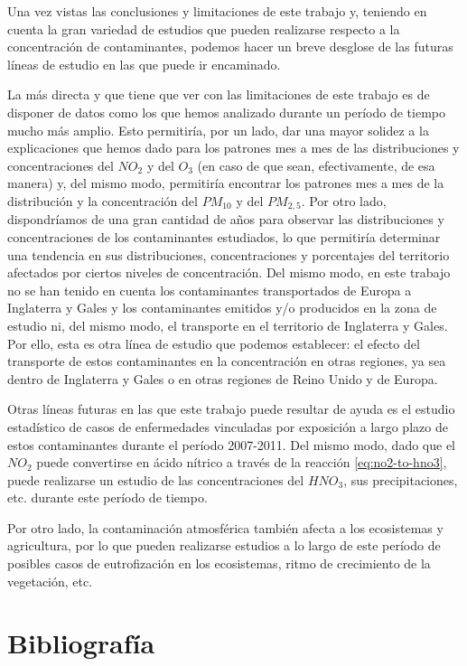 \documentclass[12pt]{article}
\begin{document}
Una vez vistas las conclusiones y limitaciones de este trabajo y, teniendo en cuenta la gran variedad de estudios que pueden realizarse respecto a la concentración de contaminantes, podemos hacer un breve desglose de las futuras líneas de estudio en las que puede ir encaminado.

La más directa y que tiene que ver con las limitaciones de este trabajo es de disponer de datos como los que hemos analizado durante un período de tiempo mucho más amplio. Esto permitiría, por un lado, dar una mayor solidez a la explicaciones que hemos dado para los patrones mes a mes de las distribuciones y concentraciones del $NO_{2}$ y del $O_{3}$ (en caso de que sean, efectivamente, de esa manera) y, del mismo modo, permitiría encontrar los patrones mes a mes de la distribución y la concentración del $PM_{10}$ y del $PM_{2,5}$. Por otro lado, dispondríamos de una gran cantidad de años para observar las distribuciones y concentraciones de los contaminantes estudiados, lo que permitiría determinar una tendencia en sus distribuciones, concentraciones y porcentajes del territorio afectados por ciertos niveles de concentración. Del mismo modo, en este trabajo no se han tenido en cuenta los contaminantes transportados de Europa a Inglaterra y Gales y los contaminantes emitidos y/o producidos en la zona de estudio ni, del mismo modo, el transporte en el territorio de Inglaterra y Gales. Por ello, esta es otra línea de estudio que podemos establecer: el efecto del transporte de estos contaminantes en la concentración en otras regiones, ya sea dentro de Inglaterra y Gales o en otras regiones de Reino Unido y de Europa.

Otras líneas futuras en las que este trabajo puede resultar de ayuda es el estudio estadístico de casos de enfermedades vinculadas por exposición a largo plazo de estos contaminantes durante el período 2007-2011. Del mismo modo, dado que el $NO_{2}$ puede convertirse en ácido nítrico a través de la reacción \ref{eq:no2-to-hno3}, puede realizarse un estudio de las concentraciones del $HNO_{3}$, sus precipitaciones, etc. durante este período de tiempo.

Por otro lado, la contaminación atmosférica también afecta a los ecosistemas y agricultura, por lo que pueden realizarse estudios a lo largo de este período de posibles casos de eutrofización en los ecosistemas, ritmo de crecimiento de la vegetación, etc.

\newpage

\section{Bibliografía}
\end{document}
